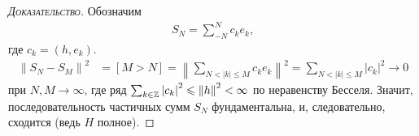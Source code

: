 \documentclass[../complex-analysis.tex]{subfiles}
\begin{document}
\begin{proof}[\normalfont\textsc{Доказательство}]
 Обозначим
 \begin{align*}
  S_N = \sum_{-N}^{N} c_ke_k,
 \end{align*} где $ c_k = (h,e_k) $.
 \begin{align*}
  \left\| S_N-S_M \right\|^{2} &= [M > N] = \left\|\sum_{N < \left| k \right| \leqslant M} c_k e_k \right\|^{2} = \sum_{N < \left| k \right| \leqslant M} \left| c_k \right|^{2} \to 0
 \end{align*} при $ N,M \to \infty $, где ряд $ \sum_{k \in \mathbb{Z}} \left| c_k \right|^{2} \leqslant \left\| h \right\|^{2}  <  \infty $ по неравенству Бесселя. Значит, последовательность частичных сумм $ S_N $  фундаментальна, и, следовательно, сходится (ведь $ H $ полное).
\end{proof}
\end{document}
